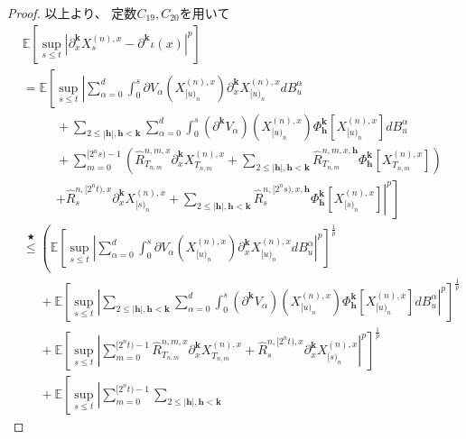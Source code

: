 \documentclass[uplatex]{jsarticle}
\theoremstyle{definition}
\def\E{\mathbb{E}}
\begin{document}
\begin{proof}
  以上より、
  定数\(C_{19},C_{20}\)を用いて
  \begin{align*}
    &\E\left[ \sup_{s\leq t} \left|
    \partial^{\mathbf{k}}_x X_s^{(n),x} - \partial^\mathbf{k}\iota(x)
    \right|^p\right] \\
    &= \E\left[ \sup_{s\leq t} \left|
    \sum_{\alpha=0}^d \int_0^s\partial V_\alpha\left(X_{[u)_n}^{(n),x}\right)
    \partial_x^{\mathbf{k}}X_{[u)_n}^{(n),x} dB_u^\alpha \right. \right. \\
    &\ \ \ \ \ \ \ \ \ \ \ \
    + \sum_{2\leq |\mathbf{h}| , \mathbf{h} < \mathbf{k}}\sum_{\alpha=0}^d
    \int_0^s \left( \partial^{\mathbf{k}} V_\alpha \right)
    \left( X_{[u)_n}^{(n),x}\right)
    \Phi_{\mathbf{h}}^{\mathbf{k}}\left[ X_{[u)_n}^{(n),x}\right] dB_u^\alpha \\
    &\ \ \ \ \ \ \ \ \ \ \ \
    + \sum_{m=0}^{[2^ns)-1}\left(
    \hat{R}_{T_{n,m}}^{n,m,x}\partial_x^{\mathbf{k}}X_{T_{n,m}}^{(n),x}
    + \sum_{2 \leq |\mathbf{h}| , \mathbf{h} < \mathbf{k}}
    \hat{R}_{T_{n,m}}^{n,m,x,\mathbf{h}}
    \Phi_{\mathbf{h}}^{\mathbf{k}}\left[ X_{T_{n,m}}^{(n),x}\right]\right) \\
    &\ \ \ \ \ \ \ \ \ \ \ \ \left.\left.
    + \hat{R}_s^{n,[2^nt),x}\partial_x^{\mathbf{k}}X_{[s)_n}^{(n),x}
    + \sum_{2 \leq |\mathbf{h}| , \mathbf{h} < \mathbf{k}}
    \hat{R}_s^{n,[2^ns),x,\mathbf{h}}
    \Phi_{\mathbf{h}}^{\mathbf{k}}\left[ X_{[s)_n}^{(n),x}\right]
    \right|^p\right] \\
    &\overset{\bigstar}{\leq}
    \left(
    \E\left[ \sup_{s\leq t} \left|
    \sum_{\alpha=0}^d \int_0^s\partial V_\alpha\left(X_{[u)_n}^{(n),x}\right)
    \partial_x^{\mathbf{k}}X_{[u)_n}^{(n),x} dB_u^\alpha \right|^p
    \right] ^{\frac{1}{p}} \right.\\
    &\ \ \ \ \ \
    + \E\left[ \sup_{s\leq t} \left|
    \sum_{2\leq |\mathbf{h}| , \mathbf{h} < \mathbf{k}} \sum_{\alpha=0}^d
    \int_0^s \left( \partial^{\mathbf{k}} V_\alpha \right)
    \left( X_{[u)_n}^{(n),x}\right)
    \Phi_{\mathbf{h}}^{\mathbf{k}}\left[ X_{[u)_n}^{(n),x}\right] dB_u^\alpha
    \right|^p \right] ^{\frac{1}{p}} \\
    &\ \ \ \ \ \
    + \E\left[ \sup_{s\leq t} \left| \sum_{m=0}^{[2^nt)-1}
    \hat{R}_{T_{n,m}}^{n,m,x}\partial_x^{\mathbf{k}}X_{T_{n,m}}^{(n),x}
    + \hat{R}_s^{n,[2^nt),x}\partial_x^{\mathbf{k}}X_{[s)_n}^{(n),x}
    \right| ^p \right] ^{\frac{1}{p}} \\
    &\ \ \ \ \ \
    + \left. \E\left[ \sup_{s\leq t} \left| \sum_{m=0}^{[2^nt)-1}
    \sum_{2 \leq |\mathbf{h}| , \mathbf{h} < \mathbf{k}}

\end{align*}
\end{proof}
\end{document}
